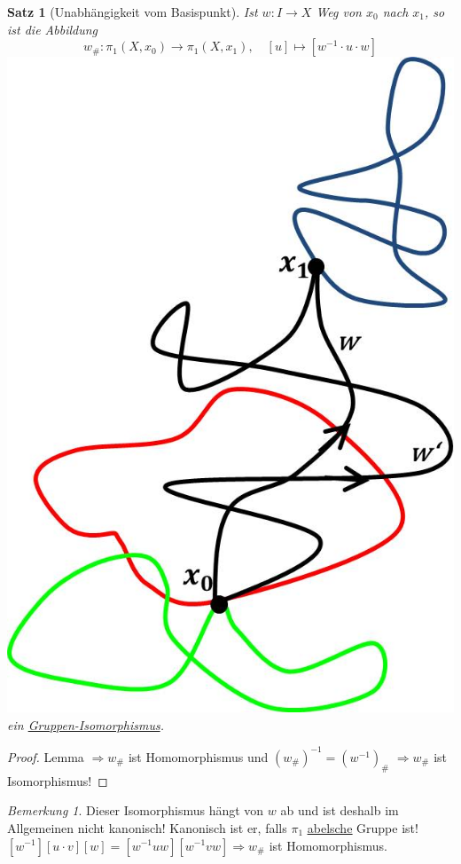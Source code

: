 \documentclass[a4paper,11pt,notitlepage]{report}
\newtheorem{theorem}{Satz}[chapter]
\theoremstyle{remark}
\newtheorem{remark}{Bemerkung}[chapter]
\theoremstyle{definition}
\begin{document}
\begin{theorem}[Unabhängigkeit vom Basispunkt]
	Ist $w \colon I \rightarrow X$ Weg von $x_0$ nach $x_1$, so ist die Abbildung 
	$$w_\# \colon \pi_1(X,x_0) \rightarrow \pi_1(X,x_1), \quad [u] \mapsto [w^{-1} \cdot u \cdot w]$$ \includegraphics[scale=0.4]{images/Basispunkt_Unabhaengigkeit.jpg}
	ein \underline{Gruppen-Isomorphismus}.
\end{theorem}

\begin{proof}
	Lemma $\Rightarrow w_\#$ ist Homomorphismus und $(w_\#)^{-1} = (w^{-1})_\#$ \newline $\Rightarrow w_\#$ ist Isomorphismus!
\end{proof}

\begin{remark}
	Dieser Isomorphismus hängt von $w$ ab und ist deshalb im Allgemeinen nicht kanonisch!
	Kanonisch ist er, falls $\pi_1$ \underline{\underline{abelsche}} Gruppe ist!
	\newline
$[w^{-1}][u \cdot v][w] = [w^{-1} u w] [w^{-1} v w] \Rightarrow w_\#$ ist Homomorphismus.

\end{remark}
\end{document}
